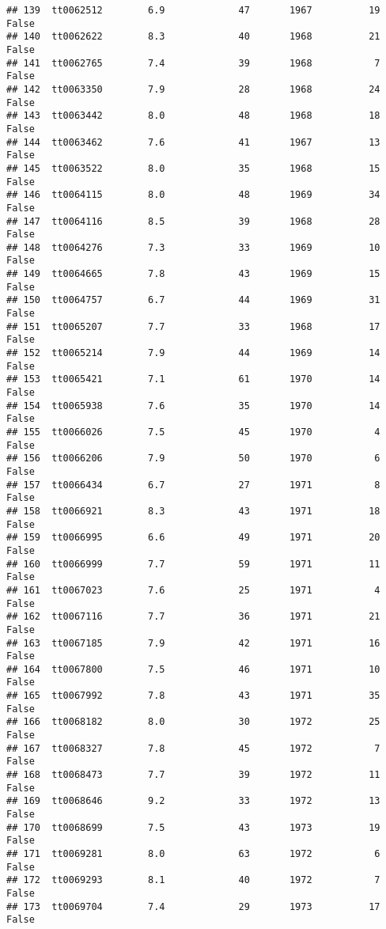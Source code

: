 \documentclass[
]{article}
\begin{document}
\begin{verbatim}
## 139  tt0062512        6.9             47       1967          19   False
## 140  tt0062622        8.3             40       1968          21   False
## 141  tt0062765        7.4             39       1968           7   False
## 142  tt0063350        7.9             28       1968          24   False
## 143  tt0063442        8.0             48       1968          18   False
## 144  tt0063462        7.6             41       1967          13   False
## 145  tt0063522        8.0             35       1968          15   False
## 146  tt0064115        8.0             48       1969          34   False
## 147  tt0064116        8.5             39       1968          28   False
## 148  tt0064276        7.3             33       1969          10   False
## 149  tt0064665        7.8             43       1969          15   False
## 150  tt0064757        6.7             44       1969          31   False
## 151  tt0065207        7.7             33       1968          17   False
## 152  tt0065214        7.9             44       1969          14   False
## 153  tt0065421        7.1             61       1970          14   False
## 154  tt0065938        7.6             35       1970          14   False
## 155  tt0066026        7.5             45       1970           4   False
## 156  tt0066206        7.9             50       1970           6   False
## 157  tt0066434        6.7             27       1971           8   False
## 158  tt0066921        8.3             43       1971          18   False
## 159  tt0066995        6.6             49       1971          20   False
## 160  tt0066999        7.7             59       1971          11   False
## 161  tt0067023        7.6             25       1971           4   False
## 162  tt0067116        7.7             36       1971          21   False
## 163  tt0067185        7.9             42       1971          16   False
## 164  tt0067800        7.5             46       1971          10   False
## 165  tt0067992        7.8             43       1971          35   False
## 166  tt0068182        8.0             30       1972          25   False
## 167  tt0068327        7.8             45       1972           7   False
## 168  tt0068473        7.7             39       1972          11   False
## 169  tt0068646        9.2             33       1972          13   False
## 170  tt0068699        7.5             43       1973          19   False
## 171  tt0069281        8.0             63       1972           6   False
## 172  tt0069293        8.1             40       1972           7   False
## 173  tt0069704        7.4             29       1973          17   False

\end{verbatim}
\end{document}
